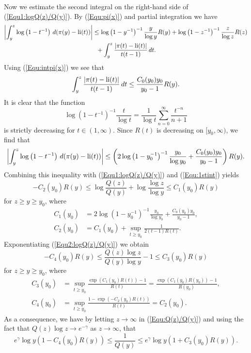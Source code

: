 \documentclass[12pt,reqno]{amsart}
\begin{document}
Now we estimate the second integral on the right-hand side of (\ref{Equ1:logQ(z)/Q(y)}). By (\ref{Equ:pi(x)}) and partial integration we have
\begin{align*}
\left|\int_{y}^{z}\log\left(1-t^{-1}\right)\,d(\pi(y)-\operatorname{li}(t))\right|&\le\log\left(1-y^{-1}\right)^{-1}\frac{y}{\log y}R(y)+\log\left(1-z^{-1}\right)^{-1}\frac{z}{\log z}R(z)\\
&\hspace*{2mm}+\int_{y}^{z}\frac{|\pi(t)-\operatorname{li}(t)|}{t(t-1)}\,dt.
\end{align*}
Using (\ref{Equ:intpi(x)}) we see that 
\[\int_{y}^{z}\frac{|\pi(t)-\operatorname{li}(t)|}{t(t-1)}\,dt\le \frac{C_0(y_0)y_0}{y_0-1}R(y).\]
It is clear that the function 
\[\log\left(1-t^{-1}\right)^{-1}\frac{t}{\log t}=\frac{1}{\log t}\sum_{n=0}^{\infty}\frac{t^{-n}}{n+1}\]
is strictly decreasing for $t\in(1,\infty)$. Since $R(t)$ is decreasing on $[y_0,\infty)$, we find that
\[\left|\int_{y}^{z}\log\left(1-t^{-1}\right)\,d(\pi(y)-\operatorname{li}(t))\right|\le \left(2\log\left(1-y_0^{-1}\right)^{-1}\frac{y_0}{\log y_0}+\frac{C_0(y_0)y_0}{y_0-1}\right)R(y).\]
Combining this inequality with (\ref{Equ1:logQ(z)/Q(y)}) and (\ref{Equ:1stint}) yields
\begin{equation}\label{Equ2:logQ(z)/Q(y)}
-C_2(y_0)R(y)\le\log\frac{Q(z)}{Q(y)}+\log\frac{\log z}{\log y}\le C_1(y_0)R(y)
\end{equation}
for $z\ge y\ge y_0$, where 
\begin{align*}
C_1(y_0)&=2\log\left(1-y_0^{-1}\right)^{-1}\frac{y_0}{\log y_0}+\frac{C_0(y_0)y_0}{y_0-1},\\
C_2(y_0)&=C_1(y_0)+\sup_{t\ge y_0}\frac{1}{2(t-1)R(t)}.
\end{align*}
Exponentiating (\ref{Equ2:logQ(z)/Q(y)}) we obtain
\begin{equation}\label{Equ:Q(z)/Q(y)}
-C_4(y_0)R(y)\le\frac{Q(z)\log z}{Q(y)\log y}-1\le C_3(y_0)R(y)
\end{equation}
for $z\ge y\ge y_0$, where
\begin{align*}
C_3(y_0)&=\sup_{t\ge y_0}\frac{\exp(C_1(y_0)R(t))-1}{R(t)}=\frac{\exp(C_1(y_0)R(y_0))-1}{R(y_0)},\\
C_4(y_0)&=\sup_{t\ge y_0}\frac{1-\exp(-C_2(y_0)R(t))}{R(t)}=C_2(y_0).
\end{align*}
As a consequence, we have by letting $z\to\infty$ in (\ref{Equ:Q(z)/Q(y)}) and using the fact that $Q(z)\log z\to e^{-\gamma}$ as $z\to\infty$, that
\begin{equation}\label{Equ:1/Q(y)}
e^{\gamma}\log y(1-C_4(y_0)R(y))\le \frac{1}{Q(y)}\le e^{\gamma}\log y(1+C_3(y_0)R(y)).
\end{equation}
\end{document}
